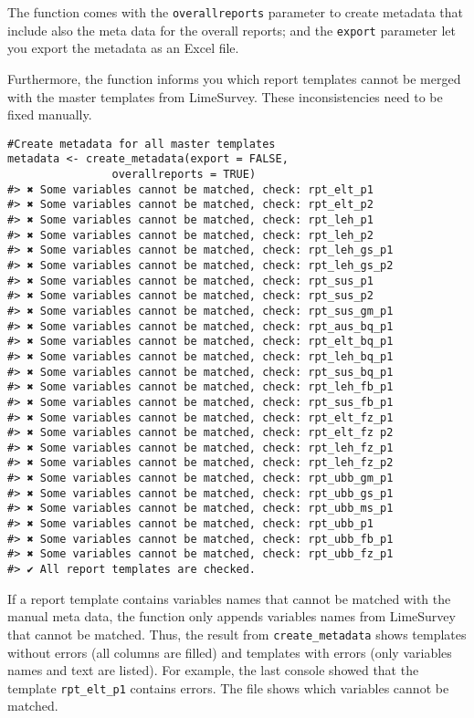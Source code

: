 The function comes with the \texttt{overallreports} parameter to create
metadata that include also the meta data for the overall reports; and
the \texttt{export} parameter let you export the metadata as an Excel
file.

Furthermore, the function informs you which report templates cannot be
merged with the master templates from LimeSurvey. These inconsistencies
need to be fixed manually.

\begin{verbatim}
#Create metadata for all master templates
metadata <- create_metadata(export = FALSE,
                overallreports = TRUE)
#> ✖ Some variables cannot be matched, check: rpt_elt_p1
#> ✖ Some variables cannot be matched, check: rpt_elt_p2
#> ✖ Some variables cannot be matched, check: rpt_leh_p1
#> ✖ Some variables cannot be matched, check: rpt_leh_p2
#> ✖ Some variables cannot be matched, check: rpt_leh_gs_p1
#> ✖ Some variables cannot be matched, check: rpt_leh_gs_p2
#> ✖ Some variables cannot be matched, check: rpt_sus_p1
#> ✖ Some variables cannot be matched, check: rpt_sus_p2
#> ✖ Some variables cannot be matched, check: rpt_sus_gm_p1
#> ✖ Some variables cannot be matched, check: rpt_aus_bq_p1
#> ✖ Some variables cannot be matched, check: rpt_elt_bq_p1
#> ✖ Some variables cannot be matched, check: rpt_leh_bq_p1
#> ✖ Some variables cannot be matched, check: rpt_sus_bq_p1
#> ✖ Some variables cannot be matched, check: rpt_leh_fb_p1
#> ✖ Some variables cannot be matched, check: rpt_sus_fb_p1
#> ✖ Some variables cannot be matched, check: rpt_elt_fz_p1
#> ✖ Some variables cannot be matched, check: rpt_elt_fz p2
#> ✖ Some variables cannot be matched, check: rpt_leh_fz_p1
#> ✖ Some variables cannot be matched, check: rpt_leh_fz_p2
#> ✖ Some variables cannot be matched, check: rpt_ubb_gm_p1
#> ✖ Some variables cannot be matched, check: rpt_ubb_gs_p1
#> ✖ Some variables cannot be matched, check: rpt_ubb_ms_p1
#> ✖ Some variables cannot be matched, check: rpt_ubb_p1
#> ✖ Some variables cannot be matched, check: rpt_ubb_fb_p1
#> ✖ Some variables cannot be matched, check: rpt_ubb_fz_p1
#> ✔ All report templates are checked.
\end{verbatim}

If a report template contains variables names that cannot be matched
with the manual meta data, the function only appends variables names
from LimeSurvey that cannot be matched. Thus, the result from
\texttt{create\_metadata} shows templates without errors (all columns
are filled) and templates with errors (only variables names and text are
listed). For example, the last console showed that the template
\texttt{rpt\_elt\_p1} contains errors. The file shows which variables
cannot be matched.

